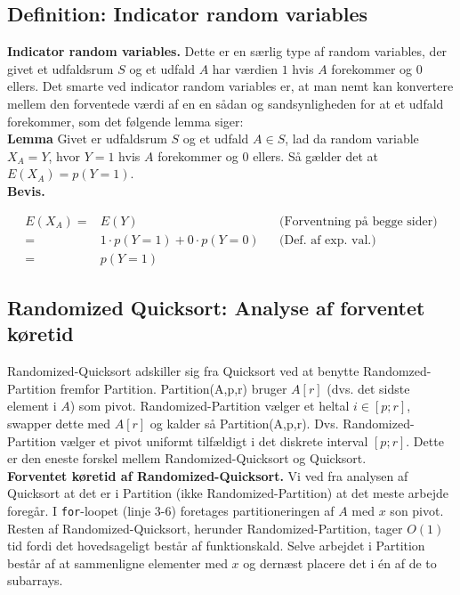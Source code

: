 \documentclass[12pt]{article}
\begin{document}
\subsection*{Definition: Indicator random variables}

\textbf{Indicator random variables.} Dette er en særlig type af random variables, der givet et udfaldsrum $S$ og et udfald $A$ har værdien $1$ hvis $A$ forekommer og $0$ ellers. Det smarte ved indicator random variables er, at man nemt kan konvertere mellem den forventede værdi af en en sådan og sandsynligheden for at et udfald forekommer, som det følgende lemma siger: \\

\textbf{Lemma} Givet er udfaldsrum $S$ og et udfald $A \in S$, lad da random variable $X_A = Y$, hvor $Y=1$ hvis $A$ forekommer og $0$ ellers. Så gælder det at $E(X_A)=p(Y=1)$. \\

\textbf{Bevis.} 

\begin{align*}
    E(X_A) =& E(Y) && \text{(Forventning på begge sider)} \\
    =& 1 \cdot p(Y=1) + 0 \cdot p(Y=0) && \text{(Def. af exp. val.)} \\
    =& p(Y=1)
\end{align*}

\subsection*{Randomized Quicksort: Analyse af forventet køretid}

Randomized-Quicksort adskiller sig fra Quicksort ved at benytte Randomzed-Partition fremfor Partition. Partition(A,p,r) bruger $A[r]$ (dvs. det sidste element i $A$) som pivot. Randomized-Partition vælger et heltal $i \in [p;r]$, swapper dette med $A[r]$ og kalder så Partition(A,p,r). Dvs. Randomized-Partition vælger et pivot uniformt tilfældigt i det diskrete interval $[p;r]$. Dette er den eneste forskel mellem Randomized-Quicksort og Quicksort. \\

\textbf{Forventet køretid af Randomized-Quicksort.} Vi ved fra analysen af Quicksort at det er i Partition (ikke Randomized-Partition) at det meste arbejde foregår. I \texttt{for}-loopet (linje 3-6) foretages partitioneringen af $A$ med $x$ son pivot. Resten af Randomized-Quicksort, herunder Randomized-Partition, tager $O(1)$ tid fordi det hovedsageligt består af funktionskald. Selve arbejdet i Partition består af at sammenligne elementer med $x$ og dernæst placere det i én af de to subarrays. \\
\end{document}
